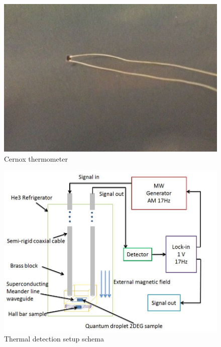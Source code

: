 \documentclass[12pt]{ruthesis}
\begin{document}
 
\begin{figure}
  \centering
  \includegraphics[totalheight=8cm]{figures/thermometercx.JPG}
  \caption{Cernox thermometer}
  \label{thermometer}
\end{figure}
 

\begin{figure}
  \centering
  \includegraphics[totalheight=8cm]{figures/SCHEMA.JPG}
  \caption{Thermal detection setup schema}
  \label{thermal-schema}
\end{figure}
 
\end{document}
